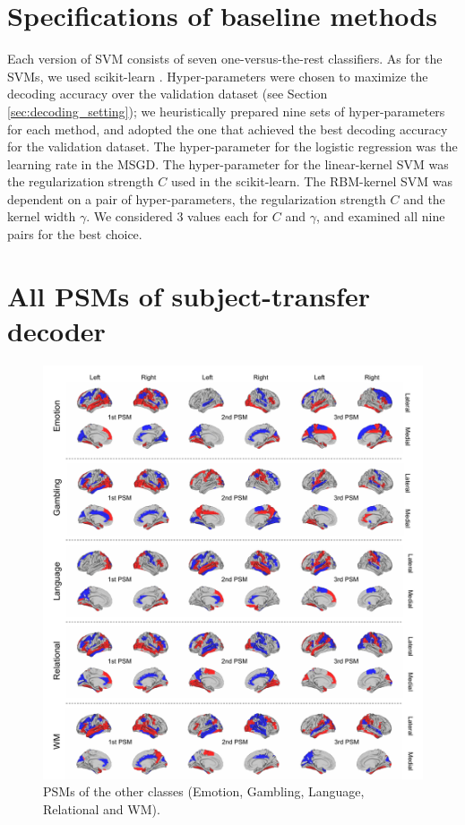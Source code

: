 \section{Specifications of baseline methods}
\label{sec:app_baseline_methods}
%
Each version of SVM consists of seven one-versus-the-rest classifiers.
%
As for the SVMs, we used scikit-learn \cite{pedregosa2011scikit}.
Hyper-parameters were chosen to maximize the decoding accuracy over the validation dataset (see Section\,\ref{sec:decoding_setting}); we heuristically prepared nine sets of hyper-parameters for each method, and adopted the one that achieved the best decoding accuracy for the validation dataset.
%
The hyper-parameter for the logistic regression was the learning rate in the MSGD.
%
The hyper-parameter for the linear-kernel SVM was the regularization strength $C$ used in the scikit-learn.
%
The RBM-kernel SVM was dependent on a pair of hyper-parameters, the regularization strength $C$ and the kernel width $\gamma$.
%
We considered $3$ values each for $C$ and $\gamma$, and examined all nine pairs for the best choice.

\clearpage
\section{All PSMs of subject-transfer decoder}
\label{sec:app_decoding}
%
\begin{figure}[htbp]
\label{fig:appendix_psa}
\begin{center}
\includegraphics[width=.90\columnwidth]{figures/psa_appendix/psa_appendix.pdf}
\caption{PSMs of the other classes (Emotion, Gambling, Language,
 Relational and WM).}
\end{center}
\end{figure}

